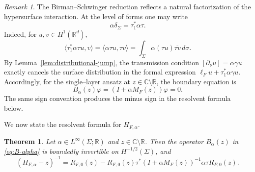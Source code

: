 \documentclass[a4paper,11pt]{article}
\numberwithin{equation}{section}
\newtheorem{thm}[lem]{Theorem}
\theoremstyle{remark}
\newtheorem{rem}[lem]{Remark}
\theoremstyle{definition}
\theoremstyle{remark}
\begin{document}
\begin{rem}\label{rem:factorization}
The Birman--Schwinger reduction reflects a natural factorization of the hypersurface interaction.
At the level of forms one may write
$$
\alpha\delta_\Sigma=\tau_1^*\alpha\tau.
$$
Indeed, for $u,v\in H^1(\mathbb R^d)$,
$$
\langle\tau_1^*\alpha\tau u,v\rangle
=
\langle\alpha\tau u,\tau v\rangle
=
\int_\Sigma\alpha(\tau u)\overline{\tau v}\,d\sigma.
$$
By Lemma~\ref{lem:distributional-jump}, the transmission condition $[\partial_\nu u]=\alpha\gamma u$ exactly cancels the surface distribution in the formal expression $\ell_Fu+\tau_1^*\alpha\gamma u$.
Accordingly, for the single--layer ansatz at $z\in\mathbb C\setminus\mathbb R$, the boundary equation is
$$
B_\alpha(z)\varphi=(I+\alpha M_F(z))\varphi=0.
$$
The same sign convention produces the minus sign in the resolvent formula below.
\end{rem}

We now state the resolvent formula for $H_{F,\alpha}$.

\begin{thm}\label{thm:resolvent-new}
Let $\alpha\in L^\infty(\Sigma;\mathbb R)$ and $z\in\mathbb C\setminus\mathbb R$.
Then the operator $B_\alpha(z)$ in \eqref{eq:B-alpha} is boundedly invertible on $H^{-1/2}(\Sigma)$, and
\begin{equation}\label{eq:resolvent-new}
(H_{F,\alpha}-z)^{-1}
=
R_{F,0}(z)
-
R_{F,0}(z)\tau^*(I+\alpha M_F(z))^{-1}
\alpha\tau R_{F,0}(z).
\end{equation}
\end{thm}
\end{document}
